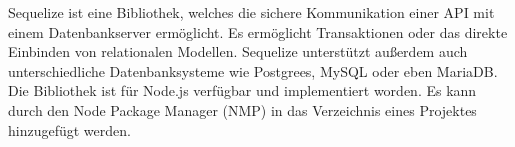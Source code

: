 
Sequelize ist eine Bibliothek, welches die sichere Kommunikation einer API mit einem Datenbankserver ermöglicht. Es ermöglicht Transaktionen oder das direkte Einbinden von relationalen Modellen. Sequelize unterstützt außerdem auch unterschiedliche Datenbanksysteme wie Postgrees, MySQL oder eben MariaDB. Die Bibliothek ist für Node.js verfügbar und implementiert worden. Es kann durch den Node Package Manager (NMP) in das Verzeichnis eines Projektes hinzugefügt werden. \cite{Sequelize} \cite{SequInstall}